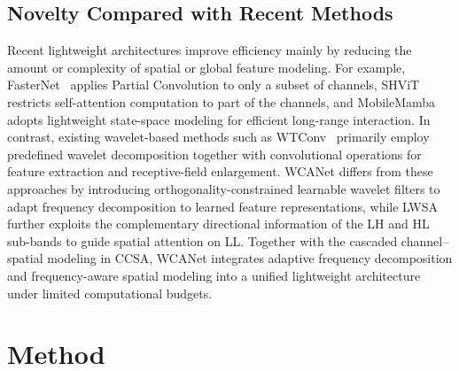 \documentclass[a4paper,fleqn]{cas-dc}
\begin{document}
\subsection{Novelty Compared with Recent Methods}

{\color{blue}
Recent lightweight architectures improve efficiency mainly by reducing the amount or complexity of spatial or global feature modeling. For example, FasterNet~\cite{chen2023run} applies Partial Convolution to only a subset of channels, SHViT~\cite{yun2024shvit} restricts self-attention computation to part of the channels, and MobileMamba~\cite{he2025mobilemamba} adopts lightweight state-space modeling for efficient long-range interaction. In contrast, existing wavelet-based methods such as WTConv~\cite{finder2024wavelet} primarily employ predefined wavelet decomposition together with convolutional operations for feature extraction and receptive-field enlargement. WCANet differs from these approaches by introducing orthogonality-constrained learnable wavelet filters to adapt frequency decomposition to learned feature representations, while LWSA further exploits the complementary directional information of the LH and HL sub-bands to guide spatial attention on LL. Together with the cascaded channel--spatial modeling in CCSA, WCANet integrates adaptive frequency decomposition and frequency-aware spatial modeling into a unified lightweight architecture under limited computational budgets.
}
















\section{Method}


\label{sec:intro}


\end{document}
